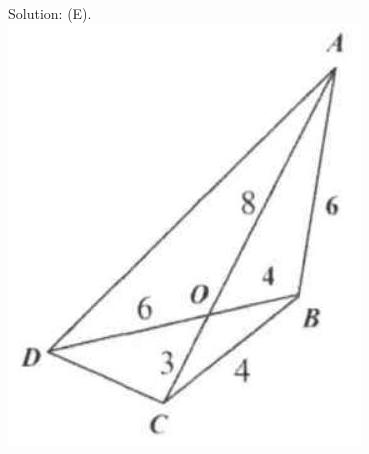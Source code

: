 \documentclass[10pt]{article}
\begin{document}
Solution: (E).\\
\includegraphics[max width=\textwidth, center]{2025_04_17_97bc1f7e44d93c271a88g-081(2)}
\end{document}
